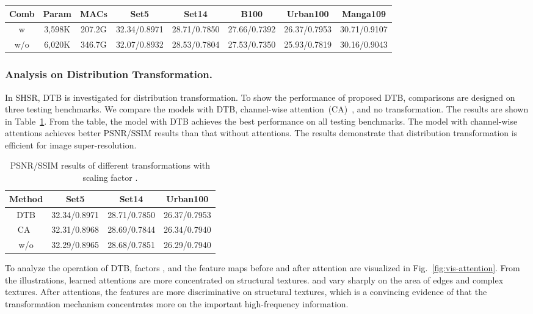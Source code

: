 \documentclass[manuscript,screen]{acmart}
\begin{document}
\begin{table*}
	\centering
	\caption{PSNR/SSIM results, parameters, and MACs of recursive combination in SMB with scaling factor .}
	\label{tab:abl_3x3}
	\begin{tabular}{|c|c|c|c|c|c|c|c|}
		\hline  
		\textbf{Comb}&\textbf{Param}& \textbf{MACs}& \textbf{Set5}& \textbf{Set14}& \textbf{B100} &\textbf{Urban100}& \textbf{Manga109}\\
		\hline
		\hline
		{w}& 3,598K& 207.2G&32.34/0.8971& 28.71/0.7850& 27.66/0.7392& 26.37/0.7953& 30.71/0.9107\\ 
		{w/o}& 6,020K& 346.7G&32.07/0.8932& 28.53/0.7804& 27.53/0.7350& 25.93/0.7819& 30.16/0.9043\\
		\hline
	\end{tabular}
\end{table*}

\subsubsection{Analysis on Distribution Transformation.}
In SHSR, DTB is investigated for distribution transformation. To show the performance of proposed DTB, comparisons are designed on three testing benchmarks. We compare the models with DTB, channel-wise attention~(CA)~\cite{senet_pami2020}, and no transformation. The results are shown in Table~\ref{tab:abl_norm}.
From the table, the model with DTB achieves the best performance on all testing benchmarks. The model with channel-wise attentions achieves better PSNR/SSIM results than that without attentions. The results demonstrate that distribution transformation is efficient for image super-resolution.

\begin{table}[t]
	\centering
	\caption{PSNR/SSIM results of different transformations with scaling factor .}
	\label{tab:abl_norm}
	\begin{tabular}{|c|c|c|c|}
		\hline  
		\textbf{Method}& \textbf{Set5}& \textbf{Set14}& \textbf{Urban100}\\
		\hline
		\hline
		{DTB}	& 32.34/0.8971& 28.71/0.7850& 26.37/0.7953\\ 
		{CA~\cite{senet_pami2020}}	& 32.31/0.8968& 28.69/0.7844& 26.34/0.7940\\
		{w/o}		& 32.29/0.8965& 28.68/0.7851& 26.29/0.7940\\
		\hline
	\end{tabular}
\end{table}

To analyze the operation of DTB, factors ,  and the feature maps before and after attention are visualized in Fig.~\ref{fig:vis-attention}. From the illustrations, learned attentions are more concentrated on structural textures.  and  vary sharply on the area of edges and complex textures. After attentions, the features are more discriminative on structural textures, which is a convincing evidence of that the transformation mechanism concentrates more on the important high-frequency information.
\end{document}
